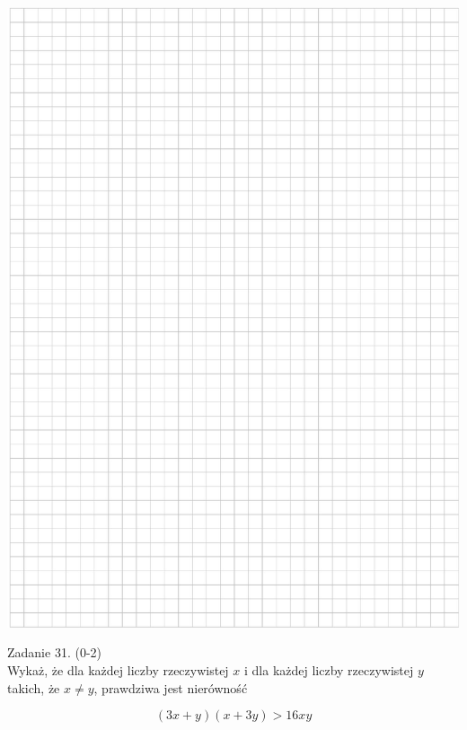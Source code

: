 \documentclass[10pt]{article}
\begin{document}
\begin{center}
\includegraphics[max width=\textwidth]{2024_11_21_0a35d272448d5080a489g-22}
\end{center}

Zadanie 31. (0-2)\\
Wykaż, że dla każdej liczby rzeczywistej \(x\) i dla każdej liczby rzeczywistej \(y\) takich, że \(x \neq y\), prawdziwa jest nierówność

\[
(3 x+y)(x+3 y)>16 x y
\]
\end{document}
